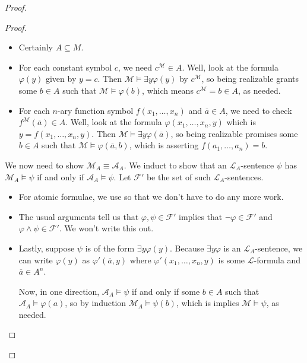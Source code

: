 \documentclass[../notes.tex]{subfiles}
\begin{document}
\begin{proof}
\begin{proof}
\begin{itemize}
			\begin{itemize}
				\item Certainly $A\subseteq M$.
				\item For each constant symbol $c$, we need $c^\mathcal M\in A$. Well, look at the formula $\varphi(y)$ given by $y=c$. Then $\mathcal M\models\exists y\varphi(y)$ by $c^\mathcal M$, so being realizable grants some $b\in A$ such that $\mathcal M\models\varphi(b)$, which means $c^\mathcal M=b\in A$, as needed.
				\item For each $n$-ary function symbol $f(x_1,\ldots,x_n)$ and $\overline a\in A$, we need to check $f^\mathcal M(\overline a)\in A$. Well, look at the formula $\varphi(x_1,\ldots,x_n,y)$ which is $y=f(x_1,\ldots,x_n,y)$. Then $\mathcal M\models\exists y\varphi(\overline a)$, so being realizable promises some $b\in A$ such that $\mathcal M\models\varphi(\overline a,b)$, which is asserting $f(a_1,\ldots,a_n)=b$.
			\end{itemize}
			We now need to show $\mathcal M_A\equiv\mathcal A_A$. We induct to show that an $\mathcal L_A$-sentence $\psi$ has $\mathcal M_A\models\psi$ if and only if $\mathcal A_A\models\psi$. Let $\mathcal F'$ be the set of such $\mathcal L_A$-sentences.
			\begin{itemize}
				\item For atomic formulae, we use  so that we don't have to do any more work.
				\item The usual arguments tell us that $\varphi,\psi\in\mathcal F'$ implies that $\lnot\varphi\in\mathcal F'$ and $\varphi\land\psi\in\mathcal F'$. We won't write this out.
				\item Lastly, suppose $\psi$ is of the form $\exists y\varphi(y)$. Because $\exists y\varphi$ is an $\mathcal L_A$-sentence, we can write $\varphi(y)$ as $\varphi'(\overline a,y)$ where $\varphi'(x_1,\ldots,x_n,y)$ is some $\mathcal L$-formula and $\overline a\in A^n$.
				
				Now, in one direction, $\mathcal A_A\models\psi$ if and only if some $b\in A$ such that $\mathcal A_A\models\varphi(a)$, so by induction $\mathcal M_A\models\psi(b)$, which is implies $\mathcal M\models\psi$, as needed.


\end{itemize}
\end{itemize}
\end{proof}
\end{proof}
\end{document}
